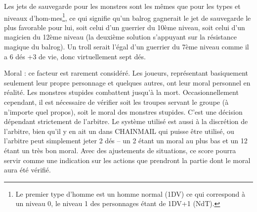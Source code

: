 \medskip

Les jets de sauvegarde pour les monstres sont les mêmes que pour les types et niveaux d'hom-mes\footnote{
    Le premier type d'homme est un homme normal (1DV) ce qui correspond à un niveau 0, le niveau 1 des personnages étant de 1DV+1 (NdT).
}, ce qui signifie qu'un balrog gagnerait le jet de sauvegarde le plus favorable pour lui, soit celui d'un guerrier du 10ème niveau, soit celui d'un magicien du 12ème niveau (la deuxième solution s'appuyant sur la résistance magique du balrog). Un troll serait l'égal d'un guerrier du 7ème niveau comme il a 6 dés +3 de vie, donc virtuellement sept dés.

\medskip

Moral : ce facteur est rarement considéré. Les joueurs, représentant basiquement seulement leur propre personnage et quelques autres, ont leur moral personnel en réalité. Les monstres stupides combattent jusqu'à la mort. Occasionnellement cependant, il est nécessaire de vérifier soit les troupes servant le groupe (à n'importe quel propos), soit le moral des monstres stupides. C'est une décision dépendant strictement de l'arbitre. Le système utilisé est aussi à la discrétion de l'arbitre, bien qu'il y en ait un dans CHAINMAIL qui puisse être utilisé, ou l'arbitre peut simplement jeter 2 dés -- un 2 étant un moral au plus bas et un 12 étant un très bon moral. Avec des ajustements de situations, ce score pourra servir comme une indication sur les actions que prendront la partie dont le moral aura été vérifié.

\medskip

